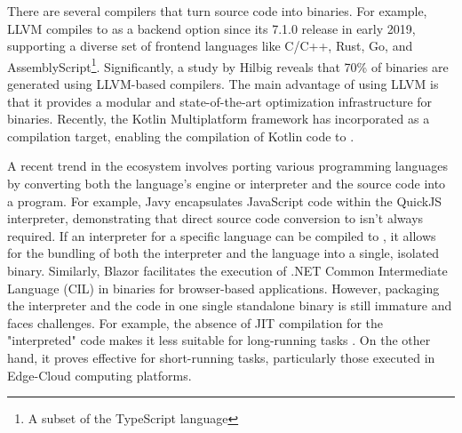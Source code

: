 There are several compilers that turn source code into \Wasm binaries. 
For example, LLVM compiles to \Wasm as a backend option since its 7.1.0 release in early 2019, supporting a diverse set of frontend languages like C/C++, Rust, Go, and AssemblyScript\footnote{A subset of the TypeScript language}.
Significantly, a study by Hilbig \cite{Hilbig2021AnES} reveals that 70\% of \Wasm binaries are generated using LLVM-based compilers. 
The main advantage of using LLVM is that it provides a modular and state-of-the-art optimization infrastructure for \Wasm binaries.
Recently, the Kotlin Multiplatform framework  has incorporated \Wasm as a compilation target, enabling the compilation of Kotlin code to \Wasm.

\pagebreak

\pagebreak

A recent trend in the \Wasm ecosystem involves porting various programming languages by converting both the language's engine or interpreter and the source code into a \Wasm program. 
For example, Javy encapsulates JavaScript code within the QuickJS interpreter, demonstrating that direct source code conversion to \Wasm isn't always required. 
If an interpreter for a specific language can be compiled to \Wasm, it allows for the bundling of both the interpreter and the language into a single, isolated \Wasm binary. 
Similarly, Blazor facilitates the execution of .NET Common Intermediate Language (CIL) in \Wasm binaries for browser-based applications. 
However, packaging the interpreter and the code in one single standalone \Wasm binary is still immature and faces challenges.
For example, the absence of JIT compilation for the "interpreted" code makes it less suitable for long-running tasks \cite{10.1145/3593434.3593454}. 
On the other hand, it proves effective for short-running tasks, particularly those executed in Edge-Cloud computing platforms.



\label{background:wasm:binary}


